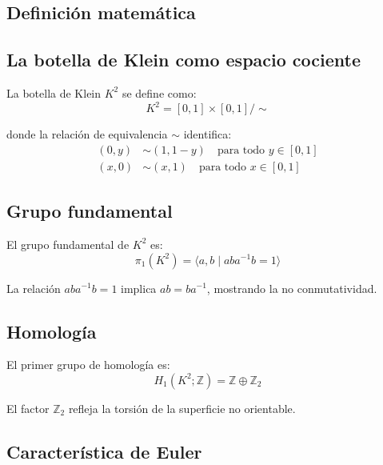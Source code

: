\documentclass[12pt,a4paper,openany]{book}
\begin{document}
\begin{nivelmatematico}

\section*{Definición matemática}

\subsection*{La botella de Klein como espacio cociente}

La botella de Klein $K^2$ se define como:
\begin{equation}
    K^2 = [0,1] \times [0,1] / \sim
\end{equation}

donde la relación de equivalencia $\sim$ identifica:
\begin{align}
    (0, y) &\sim (1, 1-y) \quad \text{para todo } y \in [0,1] \\
    (x, 0) &\sim (x, 1) \quad \text{para todo } x \in [0,1]
\end{align}

\subsection*{Grupo fundamental}

El grupo fundamental de $K^2$ es:
\begin{equation}
    \pi_1(K^2) = \langle a, b \mid aba^{-1}b = 1 \rangle
\end{equation}

La relación $aba^{-1}b = 1$ implica $ab = ba^{-1}$, mostrando la no conmutatividad.

\subsection*{Homología}

El primer grupo de homología es:
\begin{equation}
    H_1(K^2; \mathbb{Z}) = \mathbb{Z} \oplus \mathbb{Z}_2
\end{equation}

El factor $\mathbb{Z}_2$ refleja la torsión de la superficie no orientable.

\subsection*{Característica de Euler}


\end{nivelmatematico}
\end{document}
